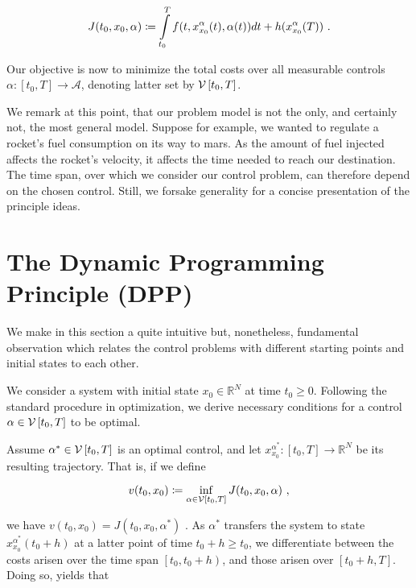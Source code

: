 	\begin{equation*}
	J(t_0, x_0, \alpha) \coloneqq \pathint{\alpha}{t_0}{T} + h(x^{\alpha}_{x_0}(T)) \ .
	\end{equation*}
	
	Our objective is now to minimize the total costs over all measurable controls $ \alpha : \left[t_0, T \right] \to \mathcal{A} $, denoting latter set by $ \controlspace[t_0] $.
	
	We remark at this point, that our problem model is not the only, and certainly not, the most general model. Suppose for example, we wanted to regulate a rocket's fuel consumption on its way to mars. As the amount of fuel injected affects the rocket's velocity, it affects the time needed to reach our destination. The time span, over which we consider our control problem, can therefore depend on the chosen control. Still, we forsake generality for a concise presentation of the principle ideas.
	
	\section{The Dynamic Programming Principle (DPP)}
	
	We make in this section a quite intuitive but, nonetheless, fundamental observation which relates the control problems with different starting points and initial states to each other.
	
	We consider a system with initial state $ x_0 \in \mathbb{R}^N $ at time $ t_0 \geq 0 $. Following the standard procedure in optimization, we derive necessary conditions for a control $ \alpha \in \controlspace[t_0] $ to be optimal. 
	
	Assume $ \alpha^{*} \in \controlspace[t_0] $ is an optimal control, and let $ x^{\alpha^{*}}_{x_0} : \left[t_0, T \right] \to \mathbb{R}^N $ be its resulting trajectory. That is, if we define
	
	\begin{equation*}
		v(t_0, x_0) \coloneqq \inf\limits_{\alpha \in \controlspace[t_0]} J(t_0, x_0, \alpha) \ ,
	\end{equation*}
	
	we have $ v(t_0, x_0) = J(t_0, x_0, \alpha^{*}) $ . As  $ \alpha^{*} $ transfers the system to state $ x^{\alpha^{*}}_{x_0}(t_0 + h) $ at a latter point of time $ t_0 + h \geq t_0 $, we differentiate between the costs arisen over the time span $ \left[t_0, t_0 + h\right) $, and those arisen over $ \left[ t_0 + h, T \right] $. Doing so, yields that
	
